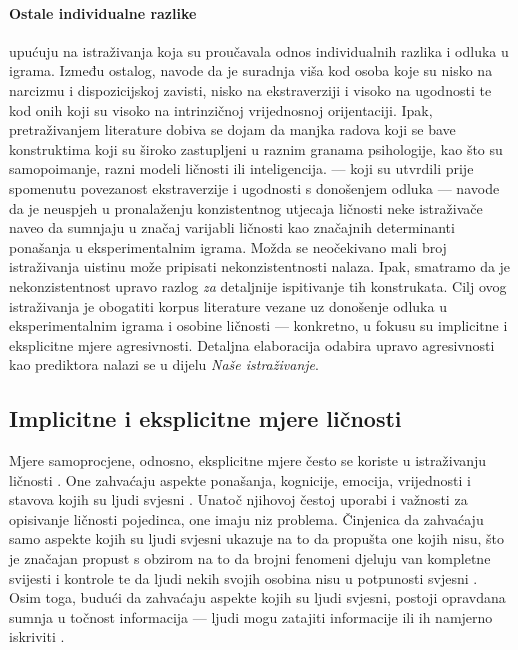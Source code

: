 \documentclass[a4paper, 12pt]{report}
\begin{document}
\paragraph{Ostale individualne razlike}  upućuju na 
istraživanja koja su proučavala odnos individualnih
razlika i odluka u igrama. Između ostalog, navode da je suradnja viša kod osoba koje su nisko na
narcizmu i dispozicijskoj zavisti, nisko na ekstraverziji i visoko na ugodnosti
te kod onih koji su visoko na intrinzičnoj vrijednosnoj orijentaciji. Ipak,
pretraživanjem literature dobiva se dojam da manjka radova koji se bave
konstruktima koji su široko zastupljeni u raznim granama psihologije,
kao što su samopoimanje, razni modeli ličnosti ili inteligencija. 
\citet[str. 290, par. 1]{koole2001social} --- koji su
utvrdili prije spomenutu povezanost ekstraverzije i ugodnosti s donošenjem
odluka --- navode da je neuspjeh u pronalaženju konzistentnog utjecaja ličnosti
neke istraživače naveo da sumnjaju u značaj varijabli ličnosti kao značajnih
determinanti ponašanja u eksperimentalnim igrama. Možda se neočekivano mali broj istraživanja
uistinu može pripisati nekonzistentnosti nalaza. Ipak, smatramo da je
nekonzistentnost upravo razlog \emph{za} detaljnije ispitivanje tih konstrukata.
Cilj ovog istraživanja je obogatiti korpus literature vezane uz donošenje odluka
u eksperimentalnim igrama
i osobine ličnosti --- konkretno, u fokusu su implicitne i eksplicitne
mjere agresivnosti. Detaljna elaboracija odabira upravo agresivnosti kao
prediktora nalazi se u dijelu \emph{Naše istraživanje}.

\subsection{Implicitne i eksplicitne mjere ličnosti}

Mjere samoprocjene, odnosno, eksplicitne mjere često se koriste u
istraživanju ličnosti \citep{wileyhandzgal}. One zahvaćaju aspekte ponašanja,
kognicije, emocija, vrijednosti i
stavova kojih su ljudi svjesni \citep{lebretsubclin}. 
Unatoč njihovoj čestoj uporabi i
važnosti za opisivanje ličnosti pojedinca, one imaju niz problema. 
Činjenica da zahvaćaju samo aspekte kojih su ljudi svjesni ukazuje na to da
propušta one kojih nisu, što je značajan propust s obzirom na to da brojni
fenomeni djeluju van kompletne svijesti i kontrole te da ljudi nekih svojih
osobina nisu u potpunosti svjesni \citep{uhlmann2012getting, wileyhandzgal, aamondt2009org}.
Osim toga, budući da zahvaćaju aspekte kojih su ljudi svjesni, postoji opravdana
sumnja u točnost informacija --- ljudi mogu zatajiti informacije ili ih namjerno
iskriviti \citep{wileyhandzgal}. 
\end{document}
